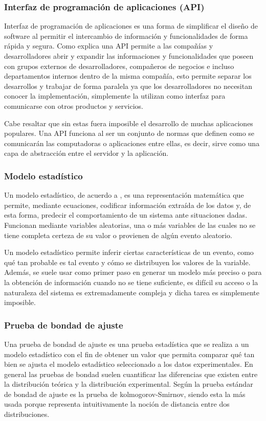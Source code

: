 \subsubsection{Interfaz de programación de aplicaciones (API)}
Interfaz de programación de aplicaciones es una forma de simplificar el diseño
de software al permitir el intercambio de información y funcionalidades de forma
rápida y segura. Como explica \textcite{API} una API permite a las compañías y
desarrolladores abrir y expandir las informaciones y funcionalidades que poseen
con grupos externos de desarrolladores, compañeros de negocios e incluso departamentos
internos dentro de la misma compañía, esto permite separar los desarrollos y
trabajar de forma paralela ya que los desarrolladores no necesitan conocer la
implementación, simplemente la utilizan como interfaz para comunicarse con otros
productos y servicios.

Cabe resaltar que sin estas fuera imposible el desarrollo de muchas aplicaciones
populares. Una API funciona al ser un conjunto de normas que definen como se
comunicarán las computadoras o aplicaciones entre ellas, es decir, sirve como
una capa de abstracción entre el servidor y la aplicación.

\subsubsection{Modelo estadístico}

Un modelo estadístico, de acuerdo a \textcite{modeloIBM}, es una representación
matemática que permite, mediante
ecuaciones, codificar información extraída de los datos y, de esta forma,
predecir el comportamiento de un sistema ante situaciones dadas. Funcionan
mediante  variables aleatorias, una o más variables de las cuales no
se tiene completa certeza de su valor o provienen de algún evento aleatorio.

Un modelo estadístico permite inferir ciertas características de un evento,
como qué tan probable es tal evento y cómo se distribuyen los valores de la
variable. Además, se suele usar como primer paso en generar un modelo más
preciso o para la obtención de información cuando no se tiene suficiente,
es difícil su acceso o la naturaleza del
sistema es extremadamente compleja y dicha tarea es simplemente imposible.


\subsubsection{Prueba de bondad de ajuste}
Una prueba de bondad de ajuste es una prueba estadística que se realiza a un
modelo estadístico con el fin de obtener un valor que permita comparar qué tan
bien se ajusta el modelo estadístico seleccionado a los datos experimentales.
En general las pruebas de bondad suelen cuantificar las diferencias que existen
entre la distribución teórica y la distribución experimental. Según \textcite{statisticsMit} la
prueba estándar de bondad de ajuste es la prueba de kolmogorov-Smirnov, siendo
esta la más usada porque representa intuitivamente la noción de distancia entre
dos distribuciones.

